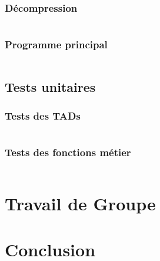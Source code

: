 \documentclass[10pt]{report}
\begin{document}
            \subsection{Décompression}
                \inputminted[breaklines]{c}{../src/decompression.c} 
            \subsection{Programme principal}
                \inputminted[breaklines]{c}{../src/main.c}
        
        \newpage
        \section{Tests unitaires}
            \subsection{Tests des TADs}
                \inputminted[breaklines]{c}{../src/testsTADs.c}
            \subsection{Tests des fonctions métier}
                \inputminted[breaklines]{c}{../src/testsFonctionsMetier.c}
                
        \chapter{Travail de Groupe}
        \chapter{Conclusion}
\end{document}
